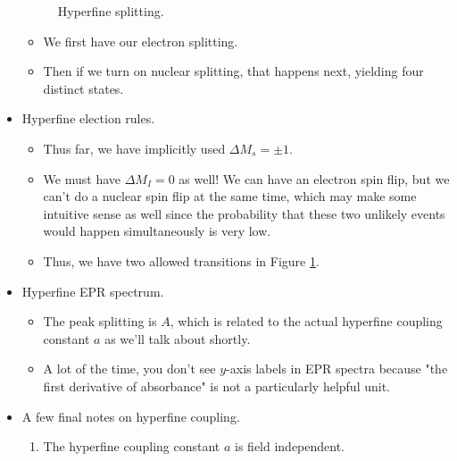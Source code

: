 \documentclass[../notes.tex]{subfiles}
\begin{document}
\begin{itemize}
\begin{figure}[h!]
        \caption{Hyperfine splitting.}
        \label{fig:hyperfineSplitting}
    \end{figure}
    \begin{itemize}
        \item We first have our electron splitting.
        \item Then if we turn on nuclear splitting, that happens next, yielding four distinct states.
    \end{itemize}
    \item Hyperfine election rules.
    \begin{itemize}
        \item Thus far, we have implicitly used $\Delta M_s=\pm 1$.
        \item We must have $\Delta M_I=0$ as well! We can have an electron spin flip, but we can't do a nuclear spin flip at the same time, which may make some intuitive sense as well since the probability that these two unlikely events would happen simultaneously is very low.
        \item Thus, we have two allowed transitions in Figure \ref{fig:hyperfineSplitting}.
    \end{itemize}
    \item Hyperfine EPR spectrum.
    \begin{itemize}
        \item The peak splitting is $A$, which is related to the actual hyperfine coupling constant $a$ as we'll talk about shortly.
        \item A lot of the time, you don't see $y$-axis labels in EPR spectra because "the first derivative of absorbance" is not a particularly helpful unit.
    \end{itemize}
    \item A few final notes on hyperfine coupling.
    \begin{enumerate}
        \item The hyperfine coupling constant $a$ is field independent.

\end{enumerate}
\end{itemize}
\end{document}

